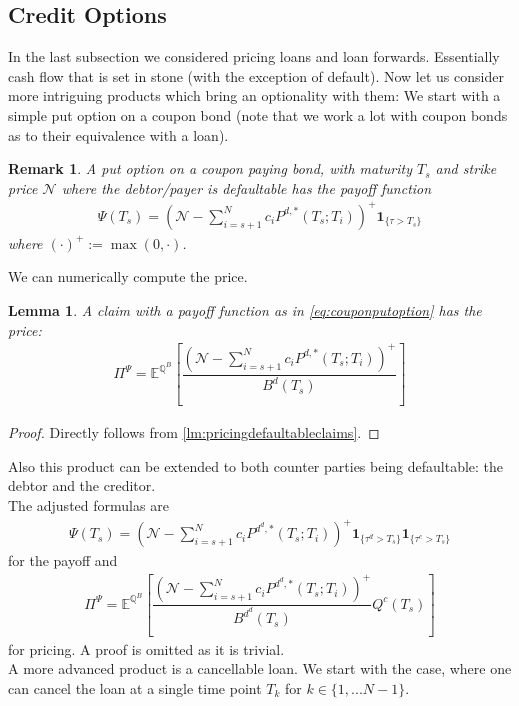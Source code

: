 \documentclass[12pt]{article}
\newtheorem{lemma}[theorem]{Lemma}
\newtheorem{remark}[theorem]{Remark}
\begin{document}
	\subsection{Credit Options}
	In the last subsection we considered pricing loans and loan forwards. Essentially cash flow that is set in stone (with the exception of default). 
	Now let us consider more intriguing products which bring an optionality with them:
	We start with a simple put option on a coupon bond (note that we work a lot with coupon bonds as to their equivalence with a loan). 
	\begin{remark}
		A put option on a coupon paying bond, with maturity $T_s$ and strike price $\mathcal{N}$ where the debtor/payer is defaultable has the payoff function
		\begin{align}\label{eq:couponputoption}
			\Psi(T_s) =\left(\mathcal{N} - \sum_{i=s+1}^{N}c_iP^{d,*}(T_s; T_i)\right)^+\mathbf{1}_{\{\tau > T_s\}}
		\end{align}
		where $\left(\cdot\right)^+ := \max(0, \cdot)$.
	\end{remark}
	We can numerically compute the price.
	\begin{lemma}
		A claim with a payoff function as in \cref{eq:couponputoption} has the price:
		\begin{align*}
			\Pi^\Psi =\mathbb{E}^{\mathbb{Q}^B}\left[\dfrac{\left(\mathcal{N} - \sum_{i=s+1}^{N}c_iP^{d,*}(T_s; T_i)\right)^+}{B^d(T_s)}\right]
		\end{align*}
	\end{lemma}
	\begin{proof}
		Directly follows from \cref{lm:pricingdefaultableclaims}.
	\end{proof}
	Also this product can be extended to both counter parties being defaultable: the debtor and the creditor.\\
	The adjusted formulas are
	\begin{align*}
		\Psi(T_s) =\left(\mathcal{N} - \sum_{i=s+1}^{N}c_iP^{d^d,*}(T_s; T_i)\right)^+\mathbf{1}_{\{\tau^d > T_s\}}\mathbf{1}_{\{\tau^c > T_s\}}
	\end{align*}
	for the payoff and 
	\begin{align*}
		\Pi^\Psi =\mathbb{E}^{\mathbb{Q}^B}\left[\dfrac{\left(\mathcal{N} - \sum_{i=s+1}^{N}c_iP^{d^d,*}(T_s; T_i)\right)^+}{B^{d^d}(T_s)}Q^c(T_s)\right]
	\end{align*}
	for pricing. A proof is omitted as it is trivial.\\
	A more advanced product is a cancellable loan. We start with the case, where one can cancel the loan at a single time point $T_k$ for $k \in \{1, ... N-1\}$.\\
\end{document}
